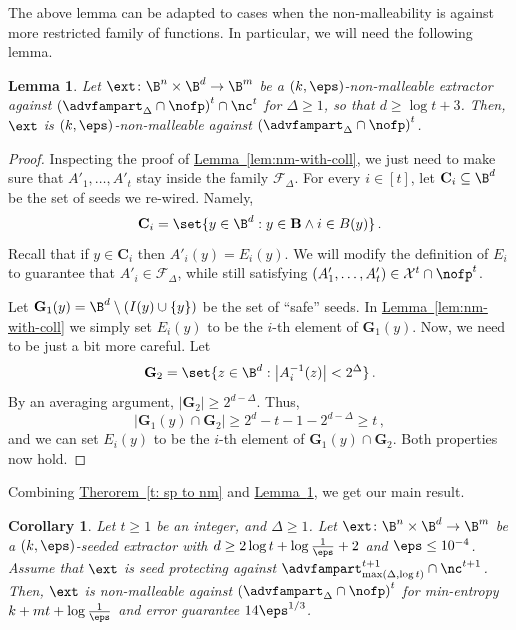 \documentclass[11pt]{article}
\numberwithin{equation}{section}
\newtheorem{lemma}[theorem]{Lemma}
\newtheorem{corollary}[theorem]{Corollary}
\theoremstyle{definition}
\theoremstyle{plain}
\newcommand{\expref}[2]{\hyperref[#2]{#1~\ref{#2}}}
\begin{document}
%
%
%

The above lemma can be adapted to cases when the non-malleability is against
more restricted family of functions. In particular, we will need the following lemma.
\begin{lemma}\label{lem:nm-with-coll22} 
Let $\ext \colon \B^{n} \times \B^{d} \rightarrow \B^{m}$ be a $(k,\eps)$-non-malleable
extractor against $\left(\advfampart_{\Delta} \cap \nofp\right)^t \cap \nc^t$ for $\Delta  \ge 1$, so that $d \ge \log {t} + 3$. Then, $\ext$ is $(k,\eps)$-non-malleable
against $\left(\advfampart_{\Delta} \cap \nofp\right)^t$.
\end{lemma}
\begin{proof}
Inspecting the proof of \expref{Lemma}{lem:nm-with-coll}, we just need to make sure that
$A'_{1},\ldots,A'_{t}$ stay inside the family $\mathcal{F}_{\Delta}$. For every $i \in [t]$, let
$\mathbf{C}_i \subseteq \B^d$ be the set of seeds we re-wired. Namely,
\[
\mathbf{C}_i = \set{y \in \B^d : y \in \mathbf{B} \wedge i \in B(y)}\,.
\]
Recall that if $y \in \mathbf{C}_i$ then $A'_{i}(y) = E_{i}(y)$. We will modify the definition of 
$E_{i}$ to guarantee that $A'_i \in \mathcal{F}_{\Delta}$, while still satisfying
$(A'_1,\ldots,A'_t) \in \mathcal{X}^t \cap \nofp^t$.%

Let $\mathbf{G}_1(y) = \B^{d} \setminus (I(y) \cup \{y\})$ be the set of ``safe'' seeds. In \expref{Lemma}{lem:nm-with-coll}
we simply set $E_{i}(y)$ to be the $i$-th element of $\mathbf{G}_1(y)$. Now, we need to be just a bit
more careful. Let
\[
\mathbf{G}_2 = \set{z \in \B^d: \left| A_{i}^{-1}(z) \right| < 2^{\Delta}}\,.
\]
By an averaging argument, $|\mathbf{G}_2| \ge 2^{d-\Delta}$. Thus, 
\[
\left|\mathbf{G}_1(y) \cap \mathbf{G}_2\right| \ge 2^d - t - 1 - 2^{d-\Delta} \ge t\,,
\]
and we can set $E_{i}(y)$ to be the $i$-th element of $\mathbf{G}_1(y) \cap \mathbf{G}_2$.
Both properties now hold.
\end{proof}
%
%
%
%
%
%
%
%
%
%

Combining \expref{Therorem}{t: sp to nm} and \expref{Lemma}{lem:nm-with-coll22}, we get our main result.

\begin{corollary}\label{main:sec2}
Let $t \ge 1$ be an integer, and $\Delta \ge 1$.
Let $\ext\colon\B^{n}\times\B^{d}\rightarrow\B^m$ be a $(k,\eps)$-seeded extractor with $d \ge 2\log{t} + \log\frac1{\eps} + 2$ and $\eps \leq 10^{-4}$. Assume that $\ext$ is seed protecting against $\advfampart^{t+1}_{\max(\Delta, \log t)} \cap \nc^{t+1}$. Then, $\ext$ is non-malleable against $\left(\advfampart_{\Delta} \cap \nofp\right)^t$  for min-entropy $k+mt+\log\frac1{\eps}$ and error guarantee $14 \eps^{1/3}$.
\end{corollary}
\end{document}

